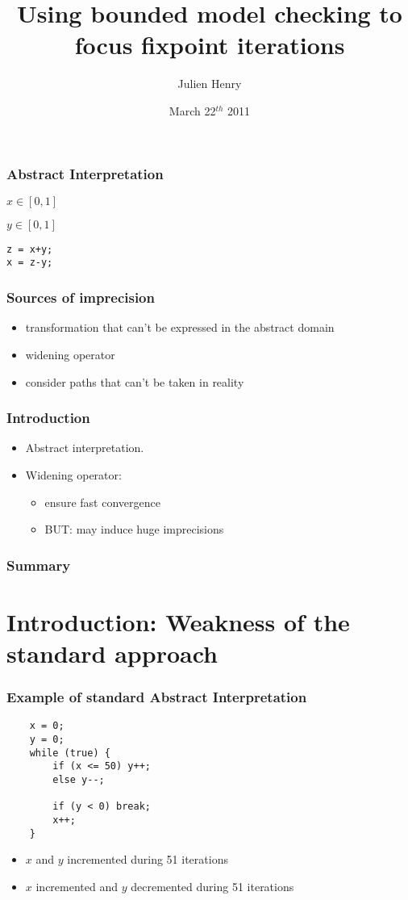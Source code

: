 \documentclass{beamer}
\title[Path-focusing]{Using bounded model checking to focus fixpoint iterations}
\author[Julien Henry]{Julien Henry}
\institute[Verimag]{Verimag (Grenoble INP)\\Grenoble\\France}
\date{March 22$^{th}$ 2011}
\begin{document}
\begin{frame}
  \titlepage
\end{frame}

\begin{frame}[containsverbatim]
\frametitle{Abstract Interpretation}
$x \in [0,1]$

$y \in [0,1]$

\begin{lstlisting}
z = x+y;
x = z-y;
\end{lstlisting}
\end{frame}

\begin{frame}
\frametitle{Sources of imprecision}
\begin{itemize}
\item transformation that can't be expressed in the abstract domain
\item widening operator
\item consider paths that can't be taken in reality
\end{itemize}
\end{frame}

\begin{frame}
  \frametitle{Introduction}
\begin{itemize}
\item Abstract interpretation.
\item Widening operator:
\begin{itemize}
\item ensure fast convergence
\item BUT: may induce huge imprecisions
\end{itemize}
\end{itemize}
\end{frame}

\begin{frame}
\frametitle{Summary}
\tableofcontents
\end{frame}

\section[Introduction]{Introduction: Weakness of the standard approach}


\begin{frame}[containsverbatim]
  \frametitle{Example of standard Abstract Interpretation}
\begin{center}
\begin{lstlisting}
	x = 0;
	y = 0;
	while (true) {
		if (x <= 50) y++;
		else y--;
	
		if (y < 0) break;
		x++;
	}
\end{lstlisting}
\end{center}

\begin{itemize}
\item  $x$ and $y$ incremented during 51 iterations
\item  $x$ incremented and $y$ decremented during 51 iterations
\end{itemize}

\end{frame}
\end{document}
